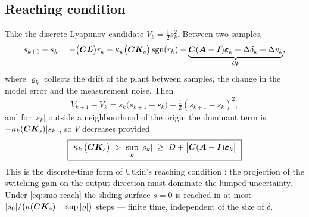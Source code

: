 \subsection{Reaching condition}
Take the discrete Lyapunov candidate $V_k = \tfrac12 s_k^2$.  Between two samples,
\begin{equation}
s_{k+1} - s_k = -\big(\bm{C}\bm{L}\big) r_k - \kappa_k\big(\bm{C}\bm{K}_s\big)\operatorname{sgn}(r_k)
             + \underbrace{\bm{C}(\bm{A}-\bm{I})\bm{\varepsilon}_k + \Delta\delta_k + \Delta v_k}_{\textstyle \varrho_k} ,
\label{eq:smo-sdot}
\end{equation}
where $\varrho_k$ collects the drift of the plant between samples, the change in the model error
and the measurement noise.  Then
\begin{equation}
V_{k+1}-V_k = s_k\big(s_{k+1}-s_k\big) + \tfrac12(s_{k+1}-s_k)^2 ,
\end{equation}
and for $|s_k|$ outside a neighbourhood of the origin the dominant term is
$-\kappa_k(\bm{C}\bm{K}_s)|s_k|$, so $V$ decreases provided
\begin{equation}
\boxed{\ \kappa_k\,\big(\mC\mK_s\big) \;>\; \sup_k|\varrho_k| \;\ge\; D + \big|\mC(\mA-\mI)\veps_k\big| \ }
\label{eq:smo-reach}
\end{equation}
This is the discrete-time form of Utkin's reaching condition \cite[Sec.~8.3]{utkin1992}: the
projection of the switching gain on the output direction must dominate the lumped uncertainty.
Under \eqref{eq:smo-reach} the sliding surface $s=0$ is reached in at most
$|s_0|/\big(\kappa(\bm{C}\bm{K}_s) - \sup|\varrho|\big)$ steps --- finite time, independent of the size
of $\delta$.

